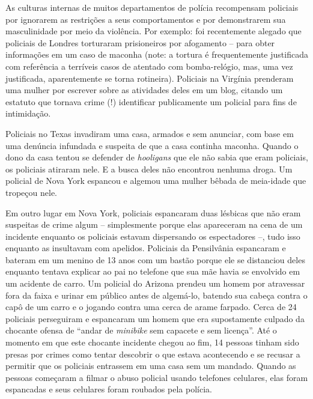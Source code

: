 As culturas internas de muitos departamentos de polícia recompensam policiais por ignorarem as restrições a seus comportamentos e por demonstrarem sua masculinidade por meio da violência. Por exemplo: foi recentemente alegado que policiais de Londres torturaram prisioneiros por afogamento -- para obter informações em um caso de maconha (note: a tortura é frequentemente justificada com referência a terríveis casos de atentado com bomba-relógio, mas, uma vez justificada, aparentemente se torna rotineira). Policiais na Virgínia prenderam uma mulher por escrever sobre as atividades deles em um blog, citando um estatuto que tornava crime (!) identificar publicamente um policial para fins de intimidação.

Policiais no Texas invadiram uma casa, armados e sem anunciar, com base em uma denúncia infundada e suspeita de que a casa continha maconha. Quando o dono da casa tentou se defender de \emph{hooligans} que ele não sabia que eram policiais, os policiais atiraram nele. E a busca deles não encontrou nenhuma droga. Um policial de Nova York espancou e algemou uma mulher bêbada de meia-idade que tropeçou nele.

Em outro lugar em Nova York, policiais espancaram duas lésbicas que não eram suspeitas de crime algum -- simplesmente porque elas apareceram na cena de um incidente enquanto os policiais estavam dispersando os espectadores --, tudo isso enquanto as insultavam com apelidos. Policiais da Pensilvânia espancaram e bateram em um menino de 13 anos com um bastão porque ele se distanciou deles enquanto tentava explicar ao pai no telefone que sua mãe havia se envolvido em um acidente de carro. Um policial do Arizona prendeu um homem por atravessar fora da faixa e urinar em público antes de algemá-lo, batendo sua cabeça contra o capô de um carro e o jogando contra uma cerca de arame farpado. Cerca de 24 policiais perseguiram e espancaram um homem que era supostamente culpado da chocante ofensa de ``andar de \emph{minibike} sem capacete e sem licença''. Até o momento em que este chocante incidente chegou ao fim, 14 pessoas tinham sido presas por crimes como tentar descobrir o que estava acontecendo e se recusar a permitir que os policiais entrassem em uma casa sem um mandado. Quando as pessoas começaram a filmar o abuso policial usando telefones celulares, elas foram espancadas e seus celulares foram roubados pela polícia.

